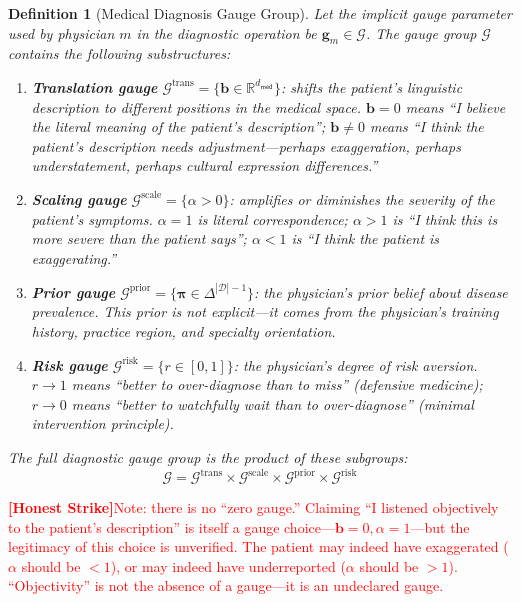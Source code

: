 \documentclass[12pt,a4paper]{article}
\newtheorem{definition}[theorem]{Definition}
\theoremstyle{remark}
\newcommand{\R}{\mathbb{R}}
\newcommand{\G}{\mathcal{G}}
\newcommand{\med}{\textsf{med}}
\newcommand{\honestcrit}[1]{%
    \textcolor{red}{\textbf{[Honest Strike]}#1}%
}
\begin{document}
\begin{definition}[Medical Diagnosis Gauge Group]\label{def:medical_gauge_group}
Let the implicit gauge parameter used by physician $m$ in the diagnostic operation be $\mathbf{g}_m \in \G$. The gauge group $\G$ contains the following substructures:

\begin{enumerate}[label=(\roman*)]
    \item \textbf{Translation gauge} $\G^{\text{trans}} = \{\mathbf{b} \in \R^{d_{\med}}\}$: shifts the patient's linguistic description to different positions in the medical space. $\mathbf{b} = 0$ means ``I believe the literal meaning of the patient's description''; $\mathbf{b} \neq 0$ means ``I think the patient's description needs adjustment---perhaps exaggeration, perhaps understatement, perhaps cultural expression differences.''
    
    \item \textbf{Scaling gauge} $\G^{\text{scale}} = \{\alpha > 0\}$: amplifies or diminishes the severity of the patient's symptoms. $\alpha = 1$ is literal correspondence; $\alpha > 1$ is ``I think this is more severe than the patient says''; $\alpha < 1$ is ``I think the patient is exaggerating.''
    
    \item \textbf{Prior gauge} $\G^{\text{prior}} = \{\bm{\pi} \in \Delta^{|\mathcal{D}|-1}\}$: the physician's prior belief about disease prevalence. This prior is not explicit---it comes from the physician's training history, practice region, and specialty orientation.
    
    \item \textbf{Risk gauge} $\G^{\text{risk}} = \{r \in [0,1]\}$: the physician's degree of risk aversion. $r \to 1$ means ``better to over-diagnose than to miss'' (defensive medicine); $r \to 0$ means ``better to watchfully wait than to over-diagnose'' (minimal intervention principle).
\end{enumerate}

The full diagnostic gauge group is the product of these subgroups:
\begin{equation}
    \G = \G^{\text{trans}} \times \G^{\text{scale}} \times \G^{\text{prior}} \times \G^{\text{risk}}
\end{equation}
\end{definition}

\honestcrit{Note: there is no ``zero gauge.'' Claiming ``I listened objectively to the patient's description'' is itself a gauge choice---$\mathbf{b}=0, \alpha=1$---but the legitimacy of this choice is unverified. The patient may indeed have exaggerated ($\alpha$ should be $<1$), or may indeed have underreported ($\alpha$ should be $>1$). ``Objectivity'' is not the absence of a gauge---it is an undeclared gauge.}
\end{document}
